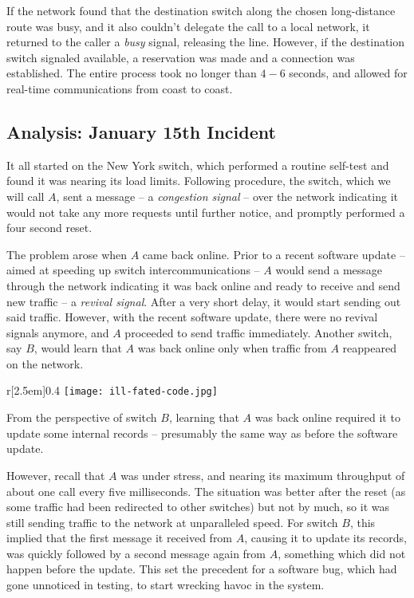 \documentclass[12pt,a4paper,notitlepage]{article}
\begin{document}
If the network found that the destination switch along the chosen long-distance route was busy, and it also couldn't delegate the call to a local network, it returned to the caller a \emph{busy} signal, releasing the line.
However, if the destination switch signaled available, a reservation was made and a connection was established. The entire process took no longer than $4-6$ seconds,\supercite{att-dennisburke1995} and allowed for real-time communications from coast to coast.

\subsection{Analysis: January 15th Incident}

It all started on the New York switch, which performed a routine self-test and found it was nearing its load limits.
Following procedure, the switch, which we will call $A$, sent a message -- a \textit{congestion signal} -- over the network indicating it would not take any more requests until further notice, and promptly performed a four second reset.

The problem arose when $A$ came back online.
Prior to a recent software update -- aimed at speeding up switch intercommunications -- $A$ would send a message through the network indicating it was back online and ready to receive and send new traffic -- a \textit{revival signal}.
After a very short delay, it would start sending out said traffic.
However, with the recent software update, there were no revival signals anymore, and $A$ proceeded to send traffic immediately.
Another switch, say $B$, would learn that $A$ was back online only when traffic from $A$ reappeared on the network.\supercite{att-risksdigest}

\begin{wrapfigure}[25]{r}[2.5em]{0.4\textwidth}
	\texttt{[image: ill-fated-code.jpg]}
\end{wrapfigure}

From the perspective of switch $B$, learning that $A$ was back online required it to update some internal records -- presumably the same way as before the software update.

However, recall that $A$ was under stress, and nearing its maximum throughput of about one call every five milliseconds.
The situation was better after the reset (as some traffic had been redirected to other switches) but not by much, so it was still sending traffic to the network at unparalleled speed.
For switch $B$, this implied that the first message it received from $A$, causing it to update its records, was quickly followed by a second message again from $A$, something which did not happen before the update.
This set the precedent for a software bug, which had gone unnoticed in testing, to start wrecking havoc in the system.
\end{document}
